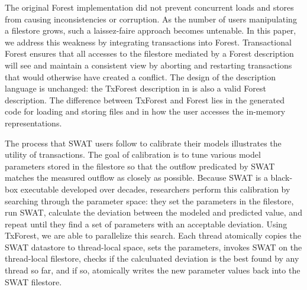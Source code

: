 
The original Forest implementation did not prevent concurrent loads
and stores from causing inconsistencies or corruption.  As the number
of users manipulating a filestore grows, such a laissez-faire approach
becomes untenable.  In this paper, we address this weakness by
integrating transactions into Forest.  Transactional Forest 
ensures that all accesses to the filestore mediated by a Forest
description will see and maintain a consistent view by aborting and
restarting transactions that would otherwise have created a
conflict. The design of the description language is unchanged: the
TxForest description in  is also a valid
Forest description.  The difference between TxForest and Forest lies
in the generated code for loading and storing files and in how the
user accesses the in-memory representations.

The process that SWAT users follow to calibrate their models
illustrates the utility of transactions.  The goal of calibration is
to tune various model parameters stored in the filestore so that the
outflow predicated by SWAT matches the measured outflow as closely as
possible.  Because SWAT is a black-box executable developed over
decades, researchers perform this calibration by searching through the
parameter space: they set the parameters in the filestore, run SWAT,
calculate the deviation between the modeled and predicted value, and
repeat until they find a set of parameters with an acceptable
deviation.  Using TxForest, we are able to parallelize this search.
Each thread atomically copies the SWAT datastore to thread-local
space, sets the parameters, invokes SWAT on the thread-local
filestore, checks if the calculuated deviation is the best found by
any thread so far, and if so, atomically writes the new parameter
values back into the SWAT filestore.



